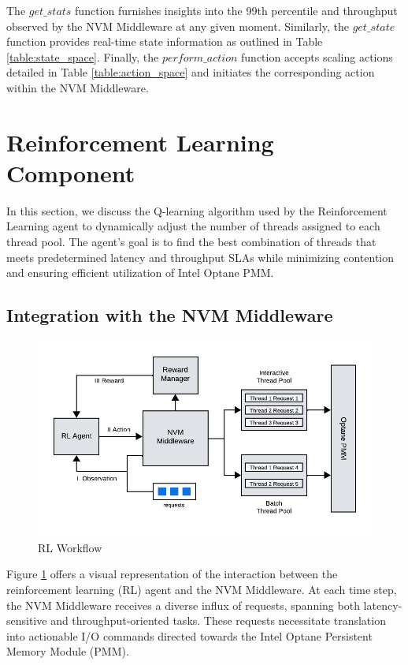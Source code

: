 The $get\_stats$ function furnishes insights into the 99th percentile and throughput observed by the NVM Middleware at any given moment. Similarly, the $get\_state$ function provides real-time state information as outlined in Table \ref{table:state_space}. Finally, the $perform\_action$ function accepts scaling actions detailed in Table \ref{table:action_space} and initiates the corresponding action within the NVM Middleware.

\section{Reinforcement Learning Component}

In this section, we discuss the Q-learning algorithm used by the Reinforcement Learning agent to dynamically adjust the number of threads assigned to each thread pool. The agent’s goal is to find the best combination of threads that meets predetermined latency and throughput SLAs while minimizing contention and ensuring efficient utilization of Intel Optane PMM. 

\subsection{Integration with the NVM Middleware}

\begin{figure}[ht]
  \centering
  \includegraphics[scale=1]{images/rl_workflow.png}
  \caption[RL Workflow]{RL Workflow}
  \label{fig:rl_workflow}
\end{figure}

Figure \ref{fig:rl_workflow} offers a visual representation of the interaction between the reinforcement learning (RL) agent and the NVM Middleware. At each time step, the NVM Middleware receives a diverse influx of requests, spanning both latency-sensitive and throughput-oriented tasks. These requests necessitate translation into actionable I/O commands directed towards the Intel Optane Persistent Memory Module (PMM).

